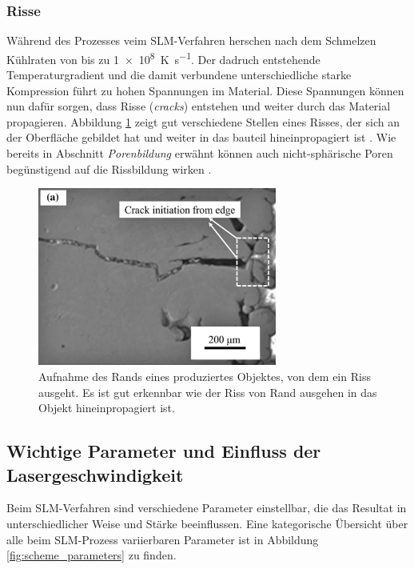 		\subsubsection{Risse}
		Während des Prozesses veim SLM-Verfahren herschen nach dem Schmelzen Kühlraten von bis zu
		\SI{1e8}{\kelvin\per\second}. Der dadruch entstehende Temperaturgradient und die damit
		verbundene unterschiedliche starke Kompression führt zu hohen Spannungen im Material.
		Diese Spannungen können nun dafür sorgen, dass Risse (\emph{cracks}) entstehen und weiter
		durch das Material propagieren. Abbildung \ref{fig:defects_cracks} zeigt gut
		verschiedene Stellen eines Risses, der sich an der Oberfläche gebildet hat und weiter in
		das bauteil hineinpropagiert ist \cite{zhang2017defect}. Wie bereits in Abschnitt
		\emph{Porenbildung} erwähnt können auch nicht-sphärische Poren begünstigend auf die
		Rissbildung wirken \cite{galy2018main}.

		\begin{figure}[ht]
			\centering
			\includegraphics[width=0.7\textwidth]{chapter/main/img/defects/cracks_part.png}
			\caption{Aufnahme des Rands eines produziertes Objektes, von dem ein Riss ausgeht. Es
			ist gut erkennbar wie der Riss von Rand ausgehen in das Objekt hineinpropagiert ist.
			\cite{zhang2017defect}}
			\label{fig:defects_cracks}
		\end{figure}

	\subsection{Wichtige Parameter und Einfluss der Lasergeschwindigkeit}
		Beim SLM-Verfahren sind verschiedene Parameter einstellbar, die das Resultat in
		unterschiedlicher Weise und Stärke beeinflussen. Eine kategorische Übersicht über alle
		beim SLM-Prozess variierbaren Parameter ist in Abbildung \ref{fig:scheme_parameters} zu
		finden.

